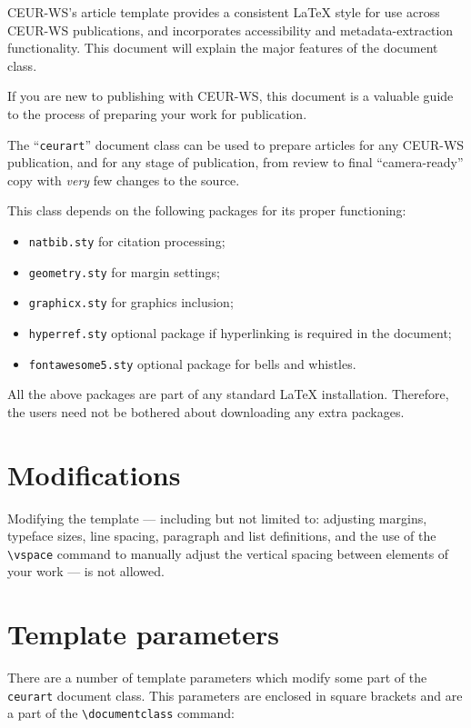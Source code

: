 \documentclass[
]{ceurart}
\begin{document}
CEUR-WS's article template provides a consistent \LaTeX{} style for
use across CEUR-WS publications, and incorporates accessibility and
metadata-extraction functionality. This document will explain the
major features of the document class.

If you are new to publishing with CEUR-WS, this document is a valuable
guide to the process of preparing your work for publication.

The ``\verb|ceurart|'' document class can be used to prepare articles
for any CEUR-WS publication, and for any stage of publication, from
review to final ``camera-ready'' copy with {\itshape very} few changes
to the source.

This class depends on the following packages
for its proper functioning:

\begin{itemize}
\item \verb|natbib.sty| for citation processing;
\item \verb|geometry.sty| for margin settings;
\item \verb|graphicx.sty| for graphics inclusion;
\item \verb|hyperref.sty| optional package if hyperlinking is required in
  the document;
\item \verb|fontawesome5.sty| optional package for bells and whistles.
\end{itemize}

All the above packages are part of any
standard \LaTeX{} installation.
Therefore, the users need not be
bothered about downloading any extra packages.

\section{Modifications}

Modifying the template --- including but not limited to: adjusting
margins, typeface sizes, line spacing, paragraph and list definitions,
and the use of the \verb|\vspace| command to manually adjust the
vertical spacing between elements of your work --- is not allowed.

\section{Template parameters}

There are a number of template
parameters which modify some part of the \verb|ceurart| document class.
This parameters are enclosed in square
brackets and are a part of the \verb|\documentclass| command:
\end{document}
